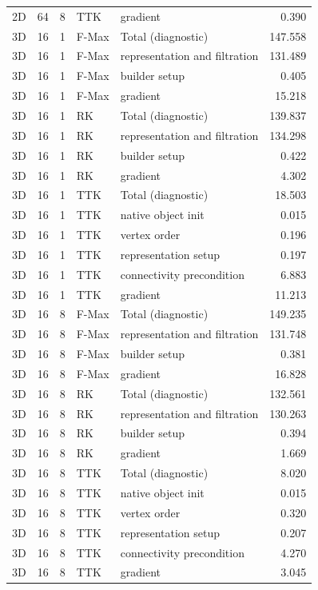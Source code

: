 \begin{tabular}{lrrllr}
2D & 64 & 8 & TTK & gradient & 0.390 \\
3D & 16 & 1 & F-Max & Total (diagnostic) & 147.558 \\
3D & 16 & 1 & F-Max & representation and filtration & 131.489 \\
3D & 16 & 1 & F-Max & builder setup & 0.405 \\
3D & 16 & 1 & F-Max & gradient & 15.218 \\
3D & 16 & 1 & RK & Total (diagnostic) & 139.837 \\
3D & 16 & 1 & RK & representation and filtration & 134.298 \\
3D & 16 & 1 & RK & builder setup & 0.422 \\
3D & 16 & 1 & RK & gradient & 4.302 \\
3D & 16 & 1 & TTK & Total (diagnostic) & 18.503 \\
3D & 16 & 1 & TTK & native object init & 0.015 \\
3D & 16 & 1 & TTK & vertex order & 0.196 \\
3D & 16 & 1 & TTK & representation setup & 0.197 \\
3D & 16 & 1 & TTK & connectivity precondition & 6.883 \\
3D & 16 & 1 & TTK & gradient & 11.213 \\
3D & 16 & 8 & F-Max & Total (diagnostic) & 149.235 \\
3D & 16 & 8 & F-Max & representation and filtration & 131.748 \\
3D & 16 & 8 & F-Max & builder setup & 0.381 \\
3D & 16 & 8 & F-Max & gradient & 16.828 \\
3D & 16 & 8 & RK & Total (diagnostic) & 132.561 \\
3D & 16 & 8 & RK & representation and filtration & 130.263 \\
3D & 16 & 8 & RK & builder setup & 0.394 \\
3D & 16 & 8 & RK & gradient & 1.669 \\
3D & 16 & 8 & TTK & Total (diagnostic) & 8.020 \\
3D & 16 & 8 & TTK & native object init & 0.015 \\
3D & 16 & 8 & TTK & vertex order & 0.320 \\
3D & 16 & 8 & TTK & representation setup & 0.207 \\
3D & 16 & 8 & TTK & connectivity precondition & 4.270 \\
3D & 16 & 8 & TTK & gradient & 3.045 \\
\hline
\end{tabular}
